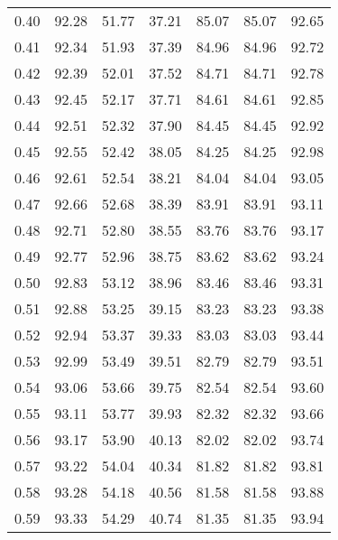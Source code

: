\begin{tabular}{|c|c|c|c|c|c|c|}
      0.40 &     92.28 &     51.77 &      37.21 &   85.07 &      85.07 &         92.65 \\
      0.41 &     92.34 &     51.93 &      37.39 &   84.96 &      84.96 &         92.72 \\
      0.42 &     92.39 &     52.01 &      37.52 &   84.71 &      84.71 &         92.78 \\
      0.43 &     92.45 &     52.17 &      37.71 &   84.61 &      84.61 &         92.85 \\
      0.44 &     92.51 &     52.32 &      37.90 &   84.45 &      84.45 &         92.92 \\
      0.45 &     92.55 &     52.42 &      38.05 &   84.25 &      84.25 &         92.98 \\
      0.46 &     92.61 &     52.54 &      38.21 &   84.04 &      84.04 &         93.05 \\
      0.47 &     92.66 &     52.68 &      38.39 &   83.91 &      83.91 &         93.11 \\
      0.48 &     92.71 &     52.80 &      38.55 &   83.76 &      83.76 &         93.17 \\
      0.49 &     92.77 &     52.96 &      38.75 &   83.62 &      83.62 &         93.24 \\
      0.50 &     92.83 &     53.12 &      38.96 &   83.46 &      83.46 &         93.31 \\
      0.51 &     92.88 &     53.25 &      39.15 &   83.23 &      83.23 &         93.38 \\
      0.52 &     92.94 &     53.37 &      39.33 &   83.03 &      83.03 &         93.44 \\
      0.53 &     92.99 &     53.49 &      39.51 &   82.79 &      82.79 &         93.51 \\
      0.54 &     93.06 &     53.66 &      39.75 &   82.54 &      82.54 &         93.60 \\
      0.55 &     93.11 &     53.77 &      39.93 &   82.32 &      82.32 &         93.66 \\
      0.56 &     93.17 &     53.90 &      40.13 &   82.02 &      82.02 &         93.74 \\
      0.57 &     93.22 &     54.04 &      40.34 &   81.82 &      81.82 &         93.81 \\
      0.58 &     93.28 &     54.18 &      40.56 &   81.58 &      81.58 &         93.88 \\
      0.59 &     93.33 &     54.29 &      40.74 &   81.35 &      81.35 &         93.94 \\

\end{tabular}
